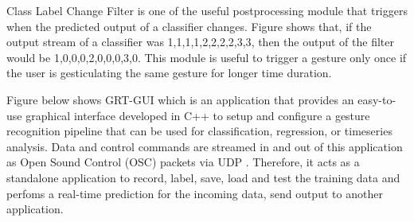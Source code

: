 Class Label Change Filter is one of the useful postprocessing module that triggers when the predicted output of a classifier changes. Figure shows that, if the output stream of a classifier was {1,1,1,1,2,2,2,2,3,3}, then the output of the filter would be {1,0,0,0,2,0,0,0,3,0}. This module is useful to trigger a gesture only once if the user is gesticulating the same gesture for longer time duration. 

Figure below shows GRT-GUI which is an application that provides an easy-to-use graphical interface developed in C++ to setup and configure a gesture recognition pipeline that can be used for classification, regression, or timeseries analysis. Data and control commands are streamed in and out of this application as Open Sound Control (OSC) packets via UDP . Therefore, it acts as a standalone application to record, label, save, load and test the training data and perfoms a real-time prediction for the incoming data, send output to another application. 

